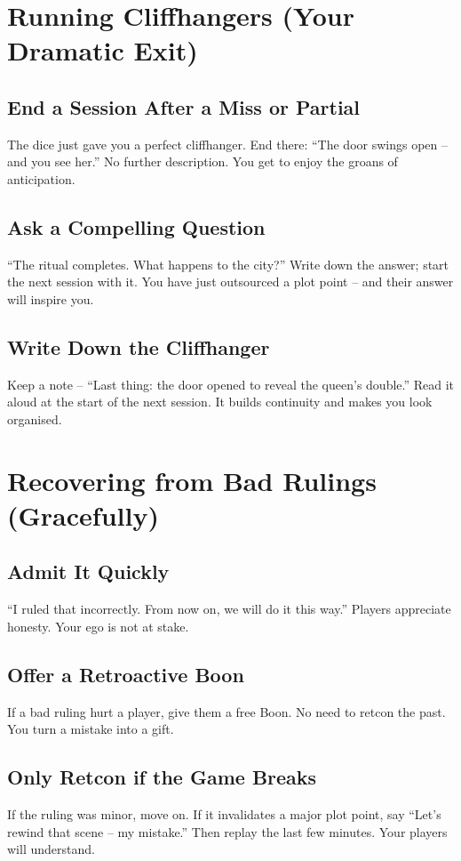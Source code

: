 \section{Running Cliffhangers (Your Dramatic Exit)}

\subsection*{End a Session After a Miss or Partial}
The dice just gave you a perfect cliffhanger. End there: “The door swings open – and you see her.” No further description. You get to enjoy the groans of anticipation.

\subsection*{Ask a Compelling Question}
“The ritual completes. What happens to the city?” Write down the answer; start the next session with it. You have just outsourced a plot point – and their answer will inspire you.

\subsection*{Write Down the Cliffhanger}
Keep a note – “Last thing: the door opened to reveal the queen’s double.” Read it aloud at the start of the next session. It builds continuity and makes you look organised.

\section{Recovering from Bad Rulings (Gracefully)}

\subsection*{Admit It Quickly}
“I ruled that incorrectly. From now on, we will do it this way.” Players appreciate honesty. Your ego is not at stake.

\subsection*{Offer a Retroactive Boon}
If a bad ruling hurt a player, give them a free Boon. No need to retcon the past. You turn a mistake into a gift.

\subsection*{Only Retcon if the Game Breaks}
If the ruling was minor, move on. If it invalidates a major plot point, say “Let’s rewind that scene – my mistake.” Then replay the last few minutes. Your players will understand.

